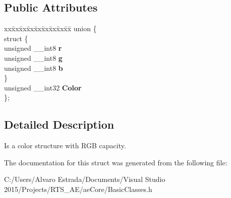 \subsection*{Public Attributes}
\begin{DoxyCompactItemize}
\item 
\begin{tabbing}
xx\=xx\=xx\=xx\=xx\=xx\=xx\=xx\=xx\=\kill
union \{\\
\>struct \{\\
\>\>unsigned \_\_int8 {\bfseries r}\\
\>\>unsigned \_\_int8 {\bfseries g}\\
\>\>unsigned \_\_int8 {\bfseries b}\\
\>\} \hypertarget{unionae_core_1_1ae_r_g_b_1_1_0D6_a5f77018757a15205d00cc26e2c87aa04}{}\label{unionae_core_1_1ae_r_g_b_1_1_0D6_a5f77018757a15205d00cc26e2c87aa04}
\\
\>unsigned \_\_int32 {\bfseries Color}\\
\}; \hypertarget{structae_core_1_1ae_r_g_b_a6a903e2f0497e3e60ff936493edc2fc7}{}\label{structae_core_1_1ae_r_g_b_a6a903e2f0497e3e60ff936493edc2fc7}
\\

\end{tabbing}\end{DoxyCompactItemize}


\subsection{Detailed Description}
Is a color structure with R\+GB capacity. 

The documentation for this struct was generated from the following file\+:\begin{DoxyCompactItemize}
\item 
C\+:/\+Users/\+Alvaro Estrada/\+Documents/\+Visual Studio 2015/\+Projects/\+R\+T\+S\+\_\+\+A\+E/ae\+Core/Basic\+Classes.\+h\end{DoxyCompactItemize}
